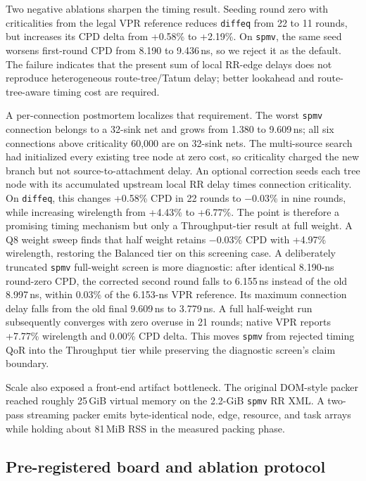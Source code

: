 \documentclass[sigconf,anonymous,review]{acmart}
\begin{document}
Two negative ablations sharpen the timing result. Seeding round zero with
criticalities from the legal VPR reference reduces \texttt{diffeq} from 22 to
11 rounds, but increases its CPD delta from +0.58\% to +2.19\%. On
\texttt{spmv}, the same seed worsens first-round CPD from 8.190 to 9.436\,ns,
so we reject it as the default. The failure indicates that the present sum of
local RR-edge delays does not reproduce heterogeneous route-tree/Tatum delay;
better lookahead and route-tree-aware timing cost are required.

A per-connection postmortem localizes that requirement. The worst
\texttt{spmv} connection belongs to a 32-sink net and grows from 1.380 to
9.609\,ns; all six connections above criticality 60,000 are on 32-sink nets.
The multi-source search had initialized every existing tree node at zero cost,
so criticality charged the new branch but not source-to-attachment delay. An
optional correction seeds each tree node with its accumulated upstream local
RR delay times connection criticality. On \texttt{diffeq}, this changes
+0.58\% CPD in 22 rounds to $-$0.03\% in nine rounds, while increasing
wirelength from +4.43\% to +6.77\%. The point is therefore a promising timing
mechanism but only a Throughput-tier result at full weight. A Q8 weight sweep
finds that half weight retains $-$0.03\% CPD with +4.97\% wirelength, restoring
the Balanced tier on this screening case. A deliberately truncated
\texttt{spmv} full-weight screen is more diagnostic:
after identical 8.190-ns round-zero CPD, the corrected second round falls to
6.155\,ns instead of the old 8.997\,ns, within 0.03\% of the 6.153-ns VPR
reference. Its maximum connection delay falls from the old final 9.609\,ns to
3.779\,ns. A full half-weight run subsequently converges with zero overuse in
21 rounds; native VPR reports +7.77\% wirelength and 0.00\% CPD delta. This
moves \texttt{spmv} from rejected timing QoR into the Throughput tier while
preserving the diagnostic screen's claim boundary.

Scale also exposed a front-end artifact bottleneck. The original DOM-style
packer reached roughly 25\,GiB virtual memory on the 2.2-GiB \texttt{spmv} RR
XML. A two-pass streaming packer emits byte-identical node, edge, resource, and
task arrays while holding about 81\,MiB RSS in the measured packing phase.

\subsection{Pre-registered board and ablation protocol}
\end{document}
